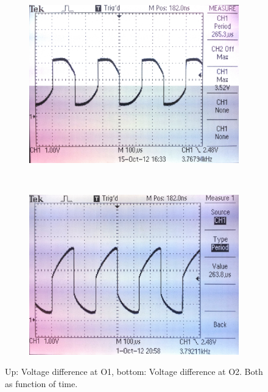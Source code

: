 \documentclass[journal]{IEEEtran}
\begin{document}
\begin{figure}
	\begin{subfigure}[b]{\columnwidth}
		\centering
		\includegraphics[width=\textwidth]{img/am_o1_timing.jpg}
	\end{subfigure} \\
	\begin{subfigure}[b]{\columnwidth}
		\centering
		\includegraphics[width=\textwidth]{img/am_o2_timing.png}
	\end{subfigure}
	\caption{Up: Voltage difference at O1, bottom: Voltage difference at O2. Both
	as function of time.}
	\label{fig:am_timing}
\end{figure}
\end{document}
